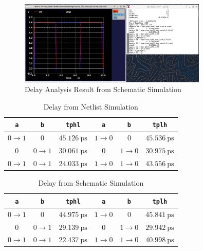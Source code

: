 \documentclass{article}
\begin{document}
	\begin{figure}[H]
		\centerline{\includegraphics[width=0.8\textwidth]{nor_delay_analysis_schem.png}}
		\caption{Delay Analysis Result from Schematic Simulation}
		\label{fig::nor_delay_analysis_schem}
	\end{figure}
	
	\begin{table}[H]
	\begin{center}
	\caption{Delay from Netlist Simulation}
	\label{table::nor_gate_delay_analysis}
	\begin{tabular}{| c | c | c || c | c | c |}
		\hline
		\texttt{a} & \texttt{b} & \texttt{tphl} & \texttt{a} & \texttt{b} & \texttt{tplh} \\
		\hline	
		$0 \rightarrow 1$ & $0$ & $45.126\ \text{ps}$ & $1 \rightarrow 0$ & $0$ & $45.536\ \text{ps}$\\
		\hline	
		$0$ & $0 \rightarrow 1$ & $30.061\ \text{ps}$ & $0$ & $1 \rightarrow 0$ & $30.975\ \text{ps}$\\
		\hline	
		$0 \rightarrow 1$ & $0 \rightarrow 1$ & $24.033\ \text{ps}$ & $1 \rightarrow 0$ & $1 \rightarrow 0$ & $43.556\ \text{ps}$\\
		\hline
	\end{tabular}
	\end{center}
	\end{table}
	
	\begin{table}[H]
	\begin{center}
	\caption{Delay from Schematic Simulation}
	\label{table::nor_gate_delay_analysis_schem}
	\begin{tabular}{| c | c | c || c | c | c |}
		\hline
		\texttt{a} & \texttt{b} & \texttt{tphl} & \texttt{a} & \texttt{b} & \texttt{tplh} \\
		\hline	
		$0 \rightarrow 1$ & $0$ & $44.975\ \text{ps}$ & $1 \rightarrow 0$ & $0$ & $45.841\ \text{ps}$\\
		\hline	
		$0$ & $0 \rightarrow 1$ & $29.139\ \text{ps}$ & $0$ & $1 \rightarrow 0$ & $29.942\ \text{ps}$\\
		\hline	
		$0 \rightarrow 1$ & $0 \rightarrow 1$ & $22.437\ \text{ps}$ & $1 \rightarrow 0$ & $1 \rightarrow 0$ & $40.998\ \text{ps}$\\
		\hline
	\end{tabular}
	\end{center}
	\end{table}
	
\end{document}
